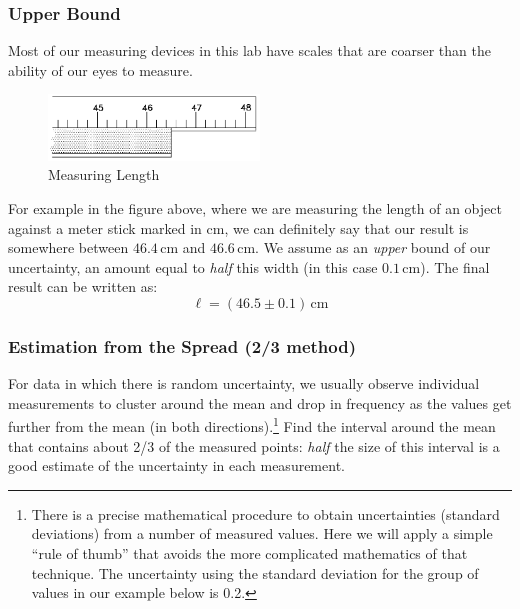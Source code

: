 \documentclass{article}
\begin{document}
\subsubsection{Upper Bound}

Most of our measuring devices in this lab have scales that are coarser than the ability of our eyes to measure.

\begin{figure}[h]
    \begin{center}
        \includegraphics[width=0.5\textwidth]{./Exp1/pic/image1.png}
    \end{center}
    \caption{Measuring Length}
    \label{fig:measure}
\end{figure}

For example in the figure above, where we are measuring the length of an object against a meter stick marked in cm, we can definitely say that our result is somewhere between $46.4\,\mathrm{cm}$ and $46.6\,\mathrm{cm}$. We assume as an \emph{upper} bound of our uncertainty, an amount equal to \emph{half} this width (in this case $0.1\,\mathrm{cm}$). The final result can be written as:
\begin{equation}
    \ell = (46.5\pm 0.1)\,\mathrm{cm}
\end{equation}

\subsubsection{Estimation from the Spread (2/3 method)}

For data in which there is random uncertainty, we usually observe individual measurements to cluster around the mean and drop in frequency as the values get further from the mean (in both directions).\footnote{There is a precise mathematical procedure to obtain uncertainties (standard deviations) from a number of measured values. Here we will apply a simple ``rule of thumb'' that avoids the more complicated mathematics of that technique. The uncertainty using the standard deviation for the group of values in our example below is 0.2.}  Find the interval around the mean that contains about 2/3 of the measured points: \emph{half} the size of this interval is a good estimate of the uncertainty in each measurement. \myskip
\end{document}
